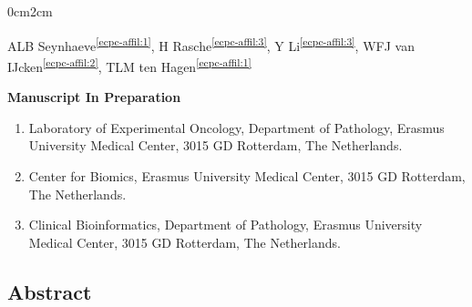 \setcounter{NAT@ctr}{-1}
\cleartorightpage
\chapter*{}\label{chapter:ecpc}



\begin{changemargin}{0cm}{2cm}
\end{changemargin}

ALB Seynhaeve\textsuperscript{\ref{ecpc-affil:1}},
H Rasche\textsuperscript{\ref{ecpc-affil:3}},
Y Li\textsuperscript{\ref{ecpc-affil:3}},
WFJ van IJcken\textsuperscript{\ref{ecpc-affil:2}},
TLM ten Hagen\textsuperscript{\ref{ecpc-affil:1}}

\textbf{Manuscript In Preparation} \\

\small
\begin{enumerate}
\itemsep-0.5em

\item Laboratory of Experimental Oncology, Department of Pathology, Erasmus University Medical Center, 3015 GD Rotterdam, The Netherlands.\label{ecpc-affil:1}
\item  Center for Biomics, Erasmus University Medical Center, 3015 GD Rotterdam, The Netherlands.\label{ecpc-affil:2}
\item Clinical Bioinformatics, Department of Pathology, Erasmus University Medical Center, 3015 GD Rotterdam, The Netherlands.\label{ecpc-affil:3}
\end{enumerate}
\normalsize


\section*{Abstract}

